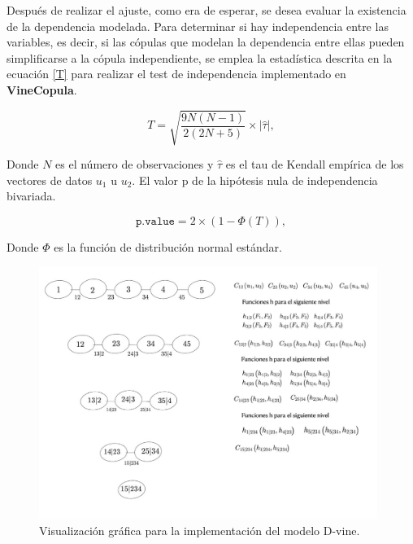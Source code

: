 Después de realizar el ajuste, como era de esperar, se desea evaluar la existencia de la dependencia modelada. Para determinar si hay independencia entre las variables, es decir, si las cópulas que modelan la dependencia entre ellas pueden simplificarse a la cópula independiente, se emplea la estadística descrita en la ecuación \eqref{T} para realizar el test de independencia implementado en \textbf{VineCopula}.
    
\begin{equation}\label{T}
    T = \sqrt{\frac{9N(N - 1)}{2(2N + 5)}} \times |\hat{\tau}|,
\end{equation}

Donde $N$ es el número de observaciones y $\hat{\tau}$ es el tau de Kendall empírica de los vectores de datos $u_1$ u $u_2$. El valor p de la hipótesis nula de independencia bivariada.

\begin{equation}
    \texttt{p.value} = 2 \times \left(1 - \Phi\left(T\right)\right),
\end{equation}


Donde $\Phi$ es la función de distribución normal estándar.

\begin{figure}[H]
    \centering
    \includegraphics[width = 0.98\textwidth]{Imagenes/Construccion.jpeg}
    \caption{Visualización gráfica para la implementación del modelo D-vine.}
    \label{fig:construccion}
\end{figure}


